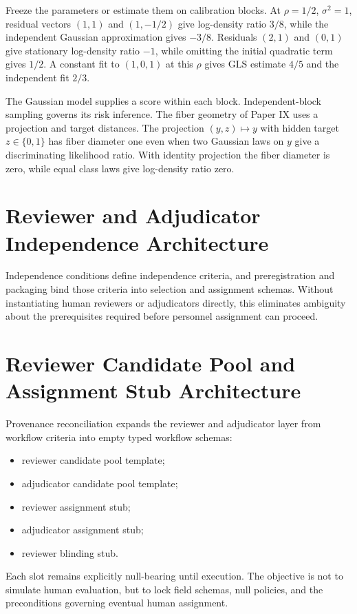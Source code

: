 \documentclass[11pt,a4paper]{article}
\begin{document}
Freeze the parameters or estimate them on calibration blocks. At $\rho=1/2$, $\sigma^2=1$, residual vectors $(1,1)$ and $(1,-1/2)$ give log-density ratio $3/8$, while the independent Gaussian approximation gives $-3/8$. Residuals $(2,1)$ and $(0,1)$ give stationary log-density ratio $-1$, while omitting the initial quadratic term gives $1/2$. A constant fit to $(1,0,1)$ at this $\rho$ gives GLS estimate $4/5$ and the independent fit $2/3$.

The Gaussian model supplies a score within each block. Independent-block sampling governs its risk inference. The fiber geometry of Paper IX uses a projection and target distances. The projection $(y,z)\mapsto y$ with hidden target $z\in\{0,1\}$ has fiber diameter one even when two Gaussian laws on $y$ give a discriminating likelihood ratio. With identity projection the fiber diameter is zero, while equal class laws give log-density ratio zero.

\section{Reviewer and Adjudicator Independence Architecture}

Independence conditions define independence criteria, and preregistration and packaging bind those criteria into selection and
assignment schemas. Without instantiating human reviewers or adjudicators directly, this eliminates ambiguity about the prerequisites required before personnel assignment can proceed.

\section{Reviewer Candidate Pool and Assignment Stub Architecture}

Provenance reconciliation expands the reviewer and adjudicator layer from workflow criteria into empty typed workflow schemas:

\begin{itemize}
\item reviewer candidate pool template;
\item adjudicator candidate pool template;
\item reviewer assignment stub;
\item adjudicator assignment stub;
\item reviewer blinding stub.
\end{itemize}

Each slot remains explicitly null-bearing until execution. The objective is not to simulate human evaluation, but to lock field schemas, null policies, and the preconditions governing eventual human assignment.
\end{document}
